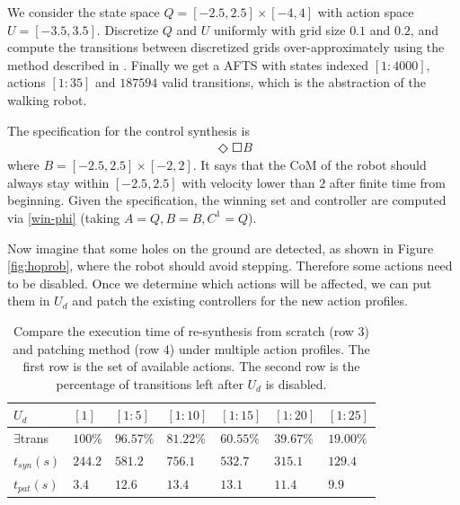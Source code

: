 {\color{black} We consider } the state space $ Q = [-2.5,2.5]\times [-4,4] $ with action space $ U = [-3.5,3.5] $. Discretize $ Q $ and $ U $ uniformly with grid size $ 0.1 $ and $ 0.2 $, and compute the transitions between discretized grids over-approximately  using the method described in \cite{Liu2014,Sun2014}. Finally we get a AFTS with states indexed $ [1:4000] $, actions $ [1:35] $ and $ 187594 $ valid transitions, which is the abstraction of the walking robot. 

The specification for the control synthesis is 
\begin{align}
\Diamond \Square B
\end{align}
where $ B=[-2.5,2.5]\times[-2,2] $. It says that the CoM of the robot should always stay within $ [-2.5,2.5] $ with velocity lower than $ 2 $ after finite time from beginning. Given the specification, the winning set and controller are computed via \eqref{win-phi} (taking $ A = Q,B=B , C^1 = Q $).

Now imagine that some holes on the ground are detected, as shown in Figure \ref{fig:hoprob}, where the robot should avoid stepping. Therefore some actions need to be disabled. Once we determine which actions will be affected, we can put them in $ U_d $ and patch the existing controllers for the new action profiles.
\begin{table}
	\centering
	\caption{Compare the execution time of re-synthesis from scratch (row $ 3 $) and patching method (row $ 4 $) under multiple action profiles. The first row is the set of available actions. The second row is the percentage of transitions left after $ U_d $ is disabled.}
	\begin{tabular}{lllllll}
		\hline 
		$ U_d $ & $ [1] $ &$ [1:5] $ & $ [1:10] $ & $ [1:15] $ & $ [1:20] $ & $ [1:25] $ \\ 
		\hline 
		$ \exists $trans & $ 100\% $ & $ 96.57\% $ & $ 81.22\% $ & $ 60.55\% $ & $ 39.67\% $ & $ 19.00\% $\\
		$ t_{syn}(s) $ & $ 244.2 $ & $ 581.2 $ & $ 756.1 $ & $ 532.7 $ & $ 315.1 $ & $ 129.4 $ \\
		$ t_{pat}(s)$ & $ 3.4 $ & $ 12.6 $ & $ 13.4 $ & $ 13.1 $ & $ 11.4 $ & $ 9.9 $ \\ 
		\hline 
	\end{tabular} 
	\label{tab: exper}
\end{table}

